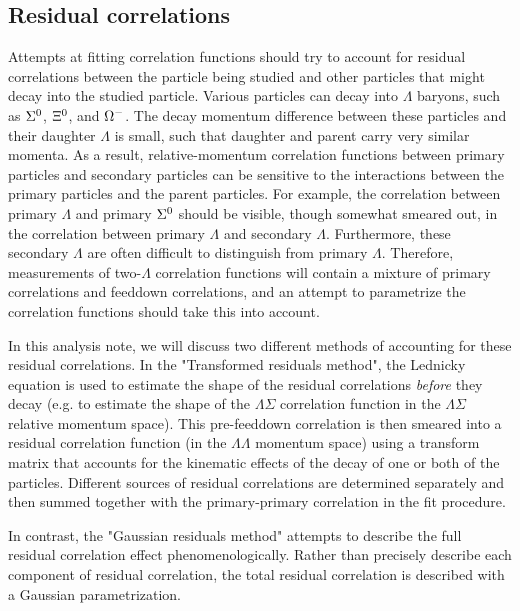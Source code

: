 \subsection{Residual correlations}
\label{sec:Residual}

Attempts at fitting correlation functions should try to account for residual correlations between the particle being studied and other particles that might decay into the studied particle.  
Various particles can decay into $\Lambda$ baryons, such as $\Sigma^{\rm 0}$, $\Xi^{\rm 0}$, and $\Omega^{\rm -}$.  
The decay momentum difference between these particles and their daughter $\Lambda$ is small, such that daughter and parent carry very similar momenta.  
As a result, relative-momentum correlation functions between primary particles and secondary particles can be sensitive to the interactions between the primary particles and the parent particles.  
For example, the correlation between primary $\Lambda$ and primary $\Sigma^{\rm 0}$ should be visible, though somewhat smeared out, in the correlation between primary $\Lambda$ and secondary $\Lambda$.  
Furthermore, these secondary $\Lambda$ are often difficult to distinguish from primary $\Lambda$.  
Therefore, measurements of two-$\Lambda$ correlation functions will contain a mixture of primary correlations and feeddown correlations, and an attempt to parametrize the correlation functions should take this into account.  

In this analysis note, we will discuss two different methods of accounting for these residual correlations.  
In the "Transformed residuals method", the Lednicky equation is used to estimate the shape of the residual correlations \emph{before} they decay (e.g. to estimate the shape of the $\Lambda\Sigma$ correlation function in the $\Lambda\Sigma$ relative momentum space).  
This pre-feeddown correlation is then smeared into a residual correlation function (in the $\Lambda\Lambda$ momentum space) using a transform matrix that accounts for the kinematic effects of the decay of one or both of the particles.  
Different sources of residual correlations are determined separately and then summed together with the primary-primary correlation in the fit procedure.

In contrast, the "Gaussian residuals method" attempts to describe the full residual correlation effect phenomenologically.  
Rather than precisely describe each component of residual correlation, the total residual correlation is described with a Gaussian parametrization.  


